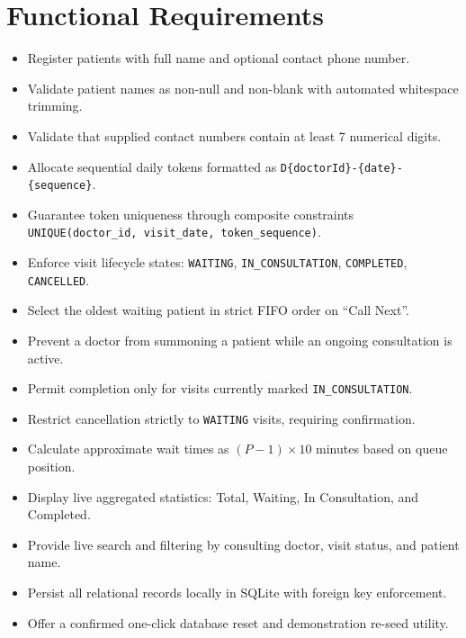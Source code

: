 \documentclass[12pt,a4paper,oneside]{report}
\begin{document}
\section{Functional Requirements}
\begin{itemize}[leftmargin=1.2cm, itemsep=0.5pt]
    \item[\textbf{FR1.}] Register patients with full name and optional contact phone number.
    \item[\textbf{FR2.}] Validate patient names as non-null and non-blank with automated whitespace trimming.
    \item[\textbf{FR3.}] Validate that supplied contact numbers contain at least 7 numerical digits.
    \item[\textbf{FR4.}] Allocate sequential daily tokens formatted as \texttt{D\{doctorId\}-\{date\}-\{sequence\}}.
    \item[\textbf{FR5.}] Guarantee token uniqueness through composite constraints \texttt{UNIQUE(doctor\_id, visit\_date, token\_sequence)}.
    \item[\textbf{FR6.}] Enforce visit lifecycle states: \texttt{WAITING}, \texttt{IN\_CONSULTATION}, \texttt{COMPLETED}, \texttt{CANCELLED}.
    \item[\textbf{FR7.}] Select the oldest waiting patient in strict FIFO order on ``Call Next''.
    \item[\textbf{FR8.}] Prevent a doctor from summoning a patient while an ongoing consultation is active.
    \item[\textbf{FR9.}] Permit completion only for visits currently marked \texttt{IN\_CONSULTATION}.
    \item[\textbf{FR10.}] Restrict cancellation strictly to \texttt{WAITING} visits, requiring confirmation.
    \item[\textbf{FR11.}] Calculate approximate wait times as $(P-1) \times 10$ minutes based on queue position.
    \item[\textbf{FR12.}] Display live aggregated statistics: Total, Waiting, In Consultation, and Completed.
    \item[\textbf{FR13.}] Provide live search and filtering by consulting doctor, visit status, and patient name.
    \item[\textbf{FR14.}] Persist all relational records locally in SQLite with foreign key enforcement.
    \item[\textbf{FR15.}] Offer a confirmed one-click database reset and demonstration re-seed utility.
\end{itemize}
\end{document}
